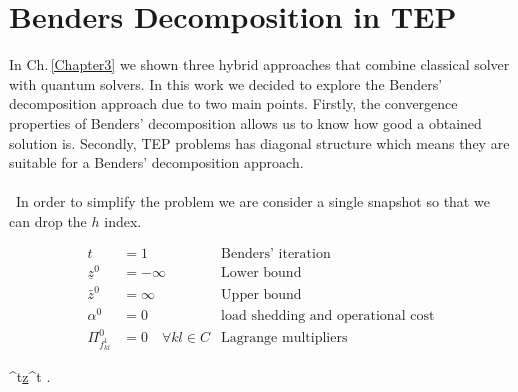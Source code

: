 \section{Benders Decomposition in TEP}
In Ch.\,\ref{Chapter3} we shown three hybrid approaches that combine classical solver with quantum solvers. In this work we decided to explore the Benders' decomposition approach due to two main points. Firstly, the convergence properties of Benders' decomposition allows us to know how good a obtained solution is. Secondly, TEP problems has diagonal structure which means they are suitable for a Benders' decomposition approach.\\\\\
In order to simplify the problem we are consider a single snapshot so that we can drop the $h$ index.
\begin{tcolorbox}[colback=white!5!white,colframe=black!75!black,title=Benders' decomposition algorithm]
    \begin{tcolorbox}[colback=black!5!white,colframe=black!75!black,title= \textbf{Step 1:} Initialization of Benders' decomposition]
    \begin{align}
    t &= 1 & \text{Benders' iteration} \\
    \underline{z}^{0} &= -\infty & \text{Lower bound}\\
    \bar{z}^{0} &= \infty & \text{Upper bound} \\
    \alpha^{0} &= 0 & \text{load shedding and operational cost} \\
    \Pi_{f_{kl}^{1}}^{0} &= 0 \quad \forall kl\in C & \text{Lagrange multipliers}
    \end{align}
    \end{tcolorbox}
    \begin{tcolorbox}[colback=blue!5!white,colframe=blue!75!black,title= \textbf{Step 2:} Master problem solved by a quantum annealer]
    \begin{mini!}[2]
	{^{t}}{\underline{z}^{t}}{}{}{}
    \addConstraint{x_{kl}}{\in \{0,1\},\,}{\forall\, kl \in C}.
    \end{mini!}
    \end{tcolorbox}
    \begin{tcolorbox}[colback=red!5!white,colframe=red!75!black,title=\textbf{Step 3:} Slave problem solved by a classical solver]

\end{tcolorbox}
\end{tcolorbox}
